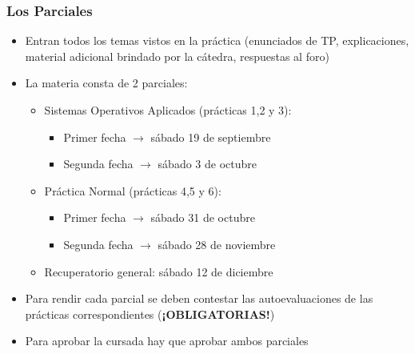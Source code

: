 \begin{frame}
	\frametitle{Los Parciales}
	\begin{itemize}
		\item Entran todos los temas vistos en la práctica (enunciados de TP, explicaciones, material adicional brindado por la cátedra, respuestas al foro)
		\item La materia consta de 2 parciales:
		\begin{itemize}
			\item Sistemas Operativos Aplicados (prácticas 1,2 y 3):
			\begin{itemize}
				\item Primer fecha $\rightarrow$ sábado 19 de septiembre
				\item Segunda fecha $\rightarrow$ sábado 3 de octubre
			\end{itemize}
			\item Práctica Normal (prácticas 4,5 y 6):
			\begin{itemize}
				\item Primer fecha $\rightarrow$ sábado 31 de octubre
				\item Segunda fecha $\rightarrow$ sábado 28 de noviembre
			\end{itemize}
			\item Recuperatorio general: sábado 12 de diciembre
		\end{itemize}
		\item Para rendir cada parcial se deben contestar las autoevaluaciones de las prácticas correspondientes (\textbf{¡OBLIGATORIAS!})
		\item Para aprobar la cursada hay que aprobar ambos parciales
	\end{itemize}
\end{frame}